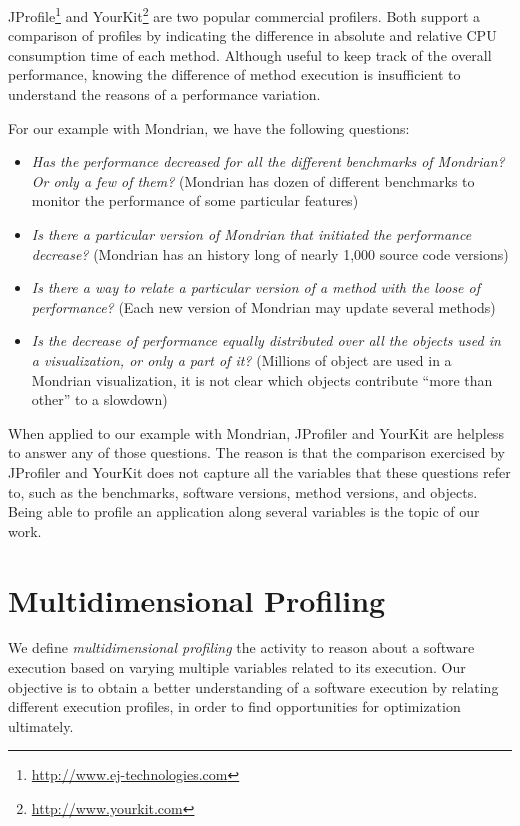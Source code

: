 \documentclass{sig-alternate}
\begin{document}
JProfile\footnote{\url{http://www.ej-technologies.com}} and YourKit\footnote{\url{http://www.yourkit.com}} are two popular commercial profilers. Both support a comparison of profiles by indicating the difference in absolute and relative CPU consumption time of each method. Although useful to keep track of the overall performance, knowing the difference of method execution is insufficient to understand the reasons of a performance variation. 

For our example with Mondrian, we have the following questions:
\begin{itemize}
\item \emph{Has the performance decreased for all the different benchmarks of Mondrian? Or only a few of them?} (Mondrian has dozen of different benchmarks to monitor the performance of some particular features)
\item \emph{Is there a particular version of Mondrian that initiated the performance decrease?} (Mondrian has an history long of nearly 1,000 source code versions)
\item \emph{Is there a way to relate a particular version of a method with the loose of performance?} (Each new version of Mondrian may update several methods)
\item \emph{Is the decrease of performance equally distributed over all the objects used in a visualization, or only a part of it?} (Millions of object are used in a Mondrian visualization, it is not clear which objects contribute ``more than other'' to a slowdown)
\end{itemize}

When applied to our example with Mondrian, JProfiler and YourKit are helpless to answer any of those questions. The reason is that the comparison exercised by JProfiler and YourKit does not capture all the variables that these questions refer to, such as the benchmarks, software versions, method versions, and objects. Being able to profile an application along several variables is the topic of our work.

\section{Multidimensional Profiling}

We define \emph{multidimensional profiling} the activity to reason about a software execution based on varying multiple variables related to its execution. Our objective is to obtain a better understanding of a software execution by relating different execution profiles, in order to find opportunities for optimization ultimately.
\end{document}

